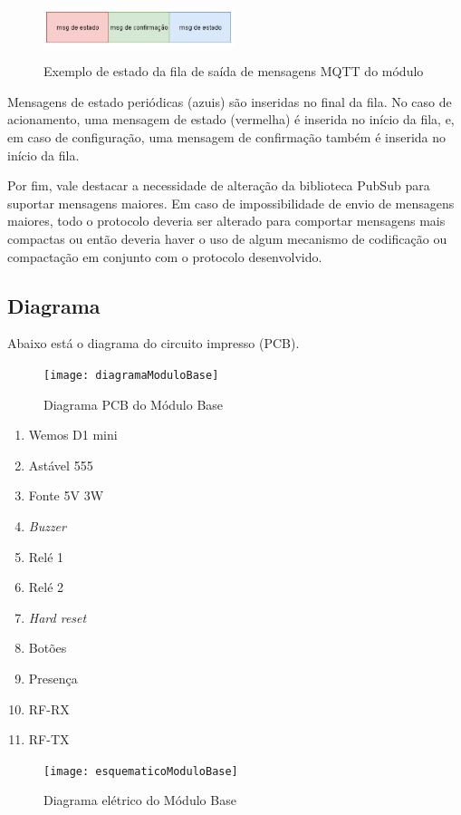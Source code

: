 \begin{figure}[H]
	\centering
	\caption{Exemplo de estado da fila de saída de mensagens MQTT do módulo}
	\includegraphics[width=0.5\textwidth]{filasaidaMQTT}
	\label{fig:filasaidaMQTT}
\end{figure}

Mensagens de estado periódicas (azuis) são inseridas no final da fila. No caso de acionamento, uma mensagem de estado (vermelha) é inserida no início da fila, e, em caso de configuração, uma mensagem de confirmação também é inserida no início da fila.

Por fim, vale destacar a necessidade de alteração da biblioteca PubSub para suportar mensagens maiores. Em caso de impossibilidade de envio de mensagens maiores, todo o protocolo deveria ser alterado para comportar mensagens mais compactas ou então deveria haver o uso de algum mecanismo de codificação ou compactação em conjunto com o protocolo desenvolvido.

\subsection{Diagrama}
Abaixo está o diagrama do circuito impresso (PCB).

\begin{figure}[H]
	\centering
	\caption{Diagrama PCB do Módulo Base}
  \texttt{[image: diagramaModuloBase]}
\label{fig:diagramaModuloBase}
\end{figure}

\begin{enumerate}
\item Wemos D1 mini
\item Astável 555
\item Fonte 5V 3W
\item \textit{Buzzer}
\item Relé 1
\item Relé 2
\item \emph{Hard reset}
\item Botões
\item Presença
\item RF-RX
\item RF-TX
\end{enumerate}

\begin{figure}[H]
	\centering
	\caption{Diagrama elétrico do Módulo Base}
  \texttt{[image: esquematicoModuloBase]}
\label{fig:esquematicoModuloBase}
\end{figure}

